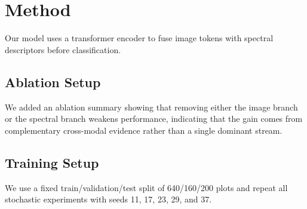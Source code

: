 \section{Method}
Our model uses a transformer encoder to fuse image tokens with spectral descriptors before classification.

\subsection{Ablation Setup}
We added an ablation summary showing that removing either the image branch or the spectral branch weakens performance, indicating that the gain comes from complementary cross-modal evidence rather than a single dominant stream.

\subsection{Training Setup}
We use a fixed train/validation/test split of 640/160/200 plots and repeat all stochastic experiments with seeds 11, 17, 23, 29, and 37.
